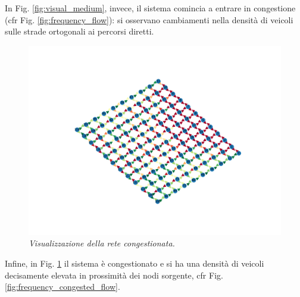 In Fig. \ref{fig:visual_medium}, invece, il sistema comincia a entrare in congestione (cfr Fig. \ref{fig:frequency_flow}): si osservano cambiamenti nella densit\`a di veicoli sulle strade ortogonali ai percorsi diretti.
\begin{figure}
    \includegraphics[scale=0.25, trim={2cm 5cm 10cm 5cm},clip]{./data/img/congested_flow.png}
    \caption[Visualizzazione della rete congestionata.]{\emph{Visualizzazione della rete congestionata.}}
    \label{fig:visual_congested}
\end{figure}
Infine, in Fig. \ref{fig:visual_congested} il sistema \`e congestionato e si ha una densit\`a di veicoli decisamente elevata in prossimit\`a dei nodi sorgente, cfr Fig. \ref{fig:frequency_congested_flow}.